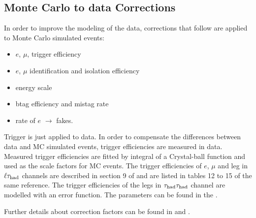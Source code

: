 \subsection{Monte Carlo to data Corrections}
\label{sec:scaleFactors}
In order to improve the modeling of the data, corrections that follow are
 applied  to Monte Carlo simulated events:
\begin{itemize}
\item $e$, $\mu$, \Tau trigger efficiency
\item $e$, $\mu$ identification and isolation efficiency
\item \Tau energy scale
\item btag efficiency and mistag rate
\item rate of $e$ $\rightarrow$ \Tau  fakes.
\end{itemize}

Trigger is just applied to data. In order to compensate the differences between data and MC simulated events, 
trigger efficiencies are measured in data. Measured trigger efficiencies are fitted by integral of a Crystal-ball function and used as
the scale factors for MC events. 
The trigger efficiencies of $e$, $\mu$ and \Tau leg in $\ell\tau_{\rm had}$ channels are described in section 9 of \cite{CMS_AN_2013-171}  and are listed in 
tables 12 to 15 of the same reference. The trigger efficiencies of the \Tau legs in $\tau_{\rm had}\tau_{\rm had}$ channel are modelled with an error function. 
The parameters can be found in the \cite{HiggsTauTautwiki}.
 
Further details about correction factors can be found  in  \cite{CMS_AN_2013-171} and \cite{HiggsTauTautwiki}.


 
